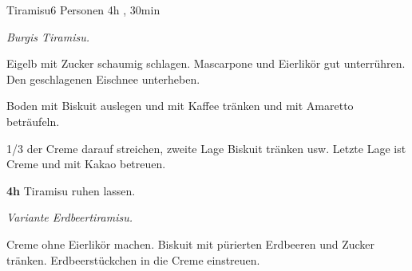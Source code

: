 \documentclass[../recipe-collections/cooking.tex]{subfiles}
\begin{document}
\begin{recipe}{Tiramisu}{6 Personen }{4h , 30min }

  \freeform{}\textit{Burgis Tiramisu.}


  Eigelb mit Zucker schaumig schlagen.
  Mascarpone und Eierlikör gut unterrühren.
  Den geschlagenen Eischnee unterheben.

  \newstep{}Boden mit Biskuit auslegen und mit Kaffee tränken und mit Amaretto beträufeln.

  \newstep{}1/3 der Creme darauf streichen, zweite Lage Biskuit tränken usw.
  Letzte Lage ist Creme und mit Kakao betreuen.

  \newstep{}\textbf{4h}
  Tiramisu ruhen lassen.

  \freeform{}\hrulefill{}

  \freeform{}\textit{Variante Erdbeertiramisu.}


  Creme ohne Eierlikör machen.
  Biskuit mit pürierten Erdbeeren und Zucker tränken.
  Erdbeerstückchen in die Creme einstreuen.

  \freeform{}\hrulefill{}

\end{recipe}
\end{document}
